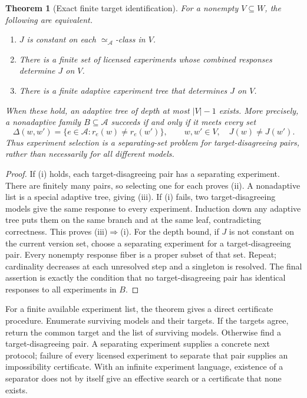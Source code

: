 \documentclass[11pt]{article}
\newtheorem{theorem}{Theorem}[section]
\theoremstyle{definition}
\begin{document}
\begin{theorem}[Exact finite target identification]
\label{thm:er-target}
For a nonempty $V\subseteq W$, the following are equivalent.
\begin{enumerate}[label=(\roman*)]
\item $J$ is constant on each $\simeq_{\mathcal A}$-class in $V$.
\item There is a finite set of licensed experiments whose combined responses
      determine $J$ on $V$.
\item There is a finite adaptive experiment tree that determines $J$ on $V$.
\end{enumerate}
When these hold, an adaptive tree of depth at most $|V|-1$ exists. More
precisely, a nonadaptive family $B\subseteq\mathcal A$ succeeds if and only
if it meets every set
\[
 \Delta(w,w')=\{e\in\mathcal A:r_e(w)\ne r_e(w')\},
 \qquad w,w'\in V,\quad J(w)\ne J(w').
\]
Thus experiment selection is a separating-set problem for target-disagreeing
pairs, rather than necessarily for all different models.
\end{theorem}
\begin{proof}
If (i) holds, each target-disagreeing pair has a separating experiment.
There are finitely many pairs, so selecting one for each proves (ii).
A nonadaptive list is a special adaptive tree, giving (iii). If (i) fails,
two target-disagreeing models give the same response to every experiment.
Induction down any adaptive tree puts them on the same branch and at the
same leaf, contradicting correctness. This proves (iii)$\Rightarrow$(i).
For the depth bound, if $J$ is not constant on the current version set,
choose a separating experiment for a target-disagreeing pair. Every nonempty
response fiber is a proper subset of that set. Repeat; cardinality decreases
at each unresolved step and a singleton is resolved. The final assertion
is exactly the condition that no target-disagreeing pair has identical
responses to all experiments in $B$.
\end{proof}

For a finite available experiment list, the theorem gives a direct
certificate procedure. Enumerate surviving models and their targets. If the
targets agree, return the common target and the list of surviving models.
Otherwise find a target-disagreeing pair. A separating experiment supplies a
concrete next protocol; failure of every licensed experiment to separate that
pair supplies an impossibility certificate. With an infinite experiment
language, existence of a separator does not by itself give an effective
search or a certificate that none exists.
\end{document}
